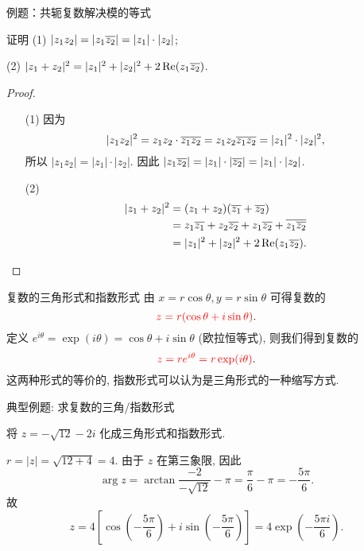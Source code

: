 \begin{frame}{例题：共轭复数解决模的等式}
\beqskip{4pt}
\begin{example}
证明 (1) $|z_1z_2|=|z_1\overline{z_2}|=|z_1|\cdot|z_2|$;

(2) $|z_1+z_2|^2=|z_1|^2+|z_2|^2+2\operatorname{Re}(z_1\overline{z_2})$.
\end{example}
\begin{proof}
\begin{itemize}
\item[(1)] 因为
\[|z_1z_2|^2=z_1z_2\cdot\overline{z_1z_2}
=z_1z_2\overline{z_1}\overline{z_2}=|z_1|^2\cdot|z_2|^2,\]
\onslide<+->
所以 $|z_1z_2|=|z_1|\cdot|z_2|$.
\onslide<+->
因此 $|z_1\overline{z_2}|=|z_1|\cdot|\overline{z_2}|=|z_1|\cdot|z_2|$.
\item[(2)]
\begin{align*}
|z_1+z_2|^2&=(z_1+z_2)(\overline{z_1}+\overline{z_2})\\
&=z_1\overline{z_1}+z_2\overline{z_2}+z_1\overline{z_2}+\overline{z_1\overline{z_2}}\\
&=|z_1|^2+|z_2|^2+2\operatorname{Re}(z_1\overline{z_2}).\qedhere
\end{align*}
\end{itemize}
\end{proof}
\endgroup
\end{frame}


\begin{frame}{复数的三角形式和指数形式}
\onslide<+->
由 $x=r\cos\theta,y=r\sin\theta$ 可得复数的
\[{\color{red}{z=r(\cos\theta+i\sin\theta)}}.\]
\onslide<+->
定义 $e^{i\theta}=\exp(i\theta)=\cos\theta+i\sin\theta$ (欧拉恒等式),
\onslide<+->
则我们得到复数的
\[{\color{red}{z=re^{i\theta}=r\exp(i\theta)}}.\]
\onslide<+->
这两种形式的等价的, 指数形式可以认为是三角形式的一种缩写方式.
\end{frame}


\begin{frame}{典型例题: 求复数的三角/指数形式}
\begin{example}
将 $z=-\sqrt{12}-2i$ 化成三角形式和指数形式.
\end{example}
\begin{solution}
$r=|z|=\sqrt{12+4}=4$.
\onslide<+->
由于 $z$ 在第三象限,
\onslide<+->
因此
\[\arg z=\arctan\frac{-2}{-\sqrt{12}}-\pi=\frac\pi6-\pi=-\frac{5\pi}6.\]
\onslide<+->
故
\[z=4\left[\cos\left(-\frac{5\pi}6\right)+i\sin\left(-
\frac{5\pi}6\right)\right]=4\exp\left(-\frac{5\pi i}6\right).\]
\end{solution}
\end{frame}


